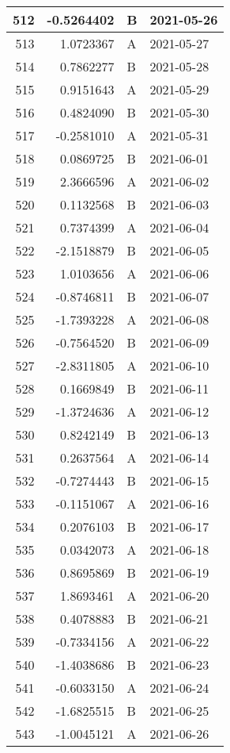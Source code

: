 \begin{tabular}{r|r|l|l}
\hline
512 & -0.5264402 & B & 2021-05-26\\
\hline
513 & 1.0723367 & A & 2021-05-27\\
\hline
514 & 0.7862277 & B & 2021-05-28\\
\hline
515 & 0.9151643 & A & 2021-05-29\\
\hline
516 & 0.4824090 & B & 2021-05-30\\
\hline
517 & -0.2581010 & A & 2021-05-31\\
\hline
518 & 0.0869725 & B & 2021-06-01\\
\hline
519 & 2.3666596 & A & 2021-06-02\\
\hline
520 & 0.1132568 & B & 2021-06-03\\
\hline
521 & 0.7374399 & A & 2021-06-04\\
\hline
522 & -2.1518879 & B & 2021-06-05\\
\hline
523 & 1.0103656 & A & 2021-06-06\\
\hline
524 & -0.8746811 & B & 2021-06-07\\
\hline
525 & -1.7393228 & A & 2021-06-08\\
\hline
526 & -0.7564520 & B & 2021-06-09\\
\hline
527 & -2.8311805 & A & 2021-06-10\\
\hline
528 & 0.1669849 & B & 2021-06-11\\
\hline
529 & -1.3724636 & A & 2021-06-12\\
\hline
530 & 0.8242149 & B & 2021-06-13\\
\hline
531 & 0.2637564 & A & 2021-06-14\\
\hline
532 & -0.7274443 & B & 2021-06-15\\
\hline
533 & -0.1151067 & A & 2021-06-16\\
\hline
534 & 0.2076103 & B & 2021-06-17\\
\hline
535 & 0.0342073 & A & 2021-06-18\\
\hline
536 & 0.8695869 & B & 2021-06-19\\
\hline
537 & 1.8693461 & A & 2021-06-20\\
\hline
538 & 0.4078883 & B & 2021-06-21\\
\hline
539 & -0.7334156 & A & 2021-06-22\\
\hline
540 & -1.4038686 & B & 2021-06-23\\
\hline
541 & -0.6033150 & A & 2021-06-24\\
\hline
542 & -1.6825515 & B & 2021-06-25\\
\hline
543 & -1.0045121 & A & 2021-06-26\\

\end{tabular}
